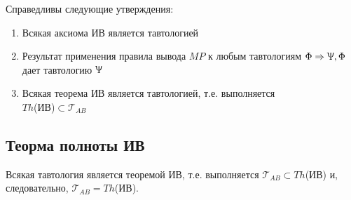 \begin{lemma}
    Справедливы следующие утверждения:

    \begin{enumerate}
        \item Всякая аксиома ИВ является тавтологией
        \item Результат применения правила вывода $MP$ к любым тавтологиям $\Phi\Rightarrow\Uppsi,\Phi$ дает тавтологию $\Uppsi$
        \item Всякая теорема ИВ является тавтологией, т.е. выполняется \\ $Th$(ИВ)$\subset\mathscr{T}_{AB}$
    \end{enumerate}
\end{lemma}

\subsection*{Теорма полноты ИВ}
Всякая тавтология является теоремой ИВ, т.е. выполняется $\mathscr{T}_{AB}\subset Th$(ИВ) и, следовательно, $\mathscr{T}_{AB}=Th$(ИВ).